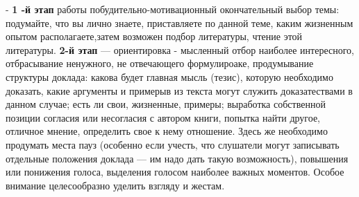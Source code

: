 {{-  \textbf{1 -й этап} работы побудительно-мотивационный окончательный выбор темы: подумайте, что вы лично знаете, приставляете по данной теме, каким жизненным опытом располагаете,затем возможен подбор литературы, чтение этой литературы.
 \textbf{2-й этап} — ориентировка - мысленный отбор наиболее интересного, отбрасывание ненужного, не отвечающего формулироаке, продумывание структуры доклада: какова будет главная мысль (тезис), которую необходимо доказать, какие аргументы и примерыв из текста могут служить доказатествами в данном случае; есть ли свои, жизненные, примеры; выработка собственной позиции согласия или несогласия с автором  книги, попытка найти другое, отличное мнение, определить свое к нему отношение. Здесь же необходимо продумать места пауз (особенно если учесть, что слушатели могут записывать отдельные положения доклада — им надо дать такую возможность), повышения или понижения голоса, выделения голосом наиболее важных моментов. Особое внимание целесообразно уделить взгляду и жестам. 
}}
